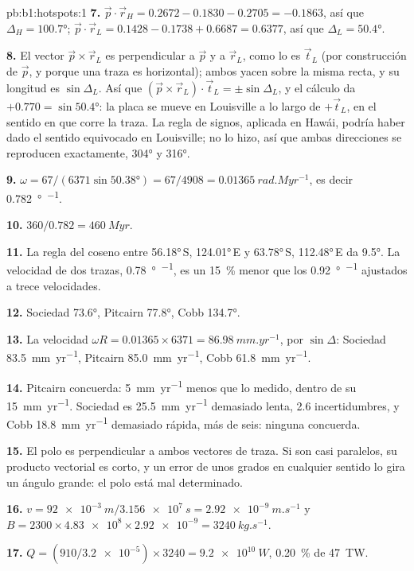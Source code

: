 \begin{solution}{pb:b1:hotspots:1}
\textbf{7.} $\vec p\cdot\vec r_H = 0.2672 - 0.1830 - 0.2705 = -0.1863$, así que
$\Delta_H = \ang{100.7}$; $\vec p\cdot\vec r_L = 0.1428 - 0.1738 + 0.6687 =
0.6377$, así que $\Delta_L = \ang{50.4}$.

\textbf{8.} El vector $\vec p\times\vec r_L$ es perpendicular a $\vec p$ y
a $\vec r_L$, como lo es $\vec t_L$ (por construcción de $\vec p$, y porque una
traza es horizontal); ambos yacen sobre la misma recta, y su longitud es
$\sin\Delta_L$. Así que $(\vec p\times\vec r_L)\cdot\vec t_L = \pm\sin\Delta_L$, y
el cálculo da $+0.770 = \sin\ang{50.4}$: la placa se mueve en Louisville
a lo largo de $+\vec t_L$, en el sentido en que corre la traza. La regla de signos, aplicada en Hawái, podría haber dado el sentido equivocado en Louisville; no lo hizo, así que ambas direcciones se reproducen exactamente, \ang{304} y \ang{316}.

\textbf{9.} $\omega = 67/(6371\sin\ang{50.38}) = 67/4908 =
\qty{0.01365}{rad.Myr^{-1}}$, es decir \qty{0.782}{\degree\per\Myr}.

\textbf{10.} $360/0.782 = \qty{460}{Myr}$.

\textbf{11.} La regla del coseno entre \ang{56.18}\,S, \ang{124.01}\,E y
\ang{63.78}\,S, \ang{112.48}\,E da \ang{9.5}. La velocidad de dos trazas,
\qty{0.78}{\degree\per\Myr}, es un \qty{15}{\percent} menor que los
\qty{0.92}{\degree\per\Myr} ajustados a trece velocidades.

\textbf{12.} Sociedad \ang{73.6}, Pitcairn \ang{77.8}, Cobb \ang{134.7}.

\textbf{13.} La velocidad $\omega R = 0.01365\times6371 = \qty{86.98}{mm.yr^{-1}}$, por
$\sin\Delta$: Sociedad \qty{83.5}{mm.yr^{-1}}, Pitcairn
\qty{85.0}{mm.yr^{-1}}, Cobb \qty{61.8}{mm.yr^{-1}}.

\textbf{14.} Pitcairn concuerda: \qty{5}{mm.yr^{-1}} menos que lo medido, dentro de
su \qty{15}{mm.yr^{-1}}. Sociedad es \qty{25.5}{mm.yr^{-1}} demasiado lenta, 2.6
incertidumbres, y Cobb \qty{18.8}{mm.yr^{-1}} demasiado rápida, más de seis:
ninguna concuerda.

\textbf{15.} El polo es perpendicular a ambos vectores de traza. Si son
casi paralelos, su producto vectorial es corto, y un error de unos grados en
cualquier sentido lo gira un ángulo grande: el polo está mal determinado.

\textbf{16.} $v = \qty{92e-3}{m}/\qty{3.156e7}{s} = \qty{2.92e-9}{m.s^{-1}}$
y $B = 2300\times\num{4.83e8}\times\num{2.92e-9} = \qty{3240}{kg.s^{-1}}$.

\textbf{17.} $Q = (910/\num{3.2e-5})\times3240 = \qty{9.2e10}{W}$,
\qty{0.20}{\percent} de \qty{47}{TW}.


\end{solution}
